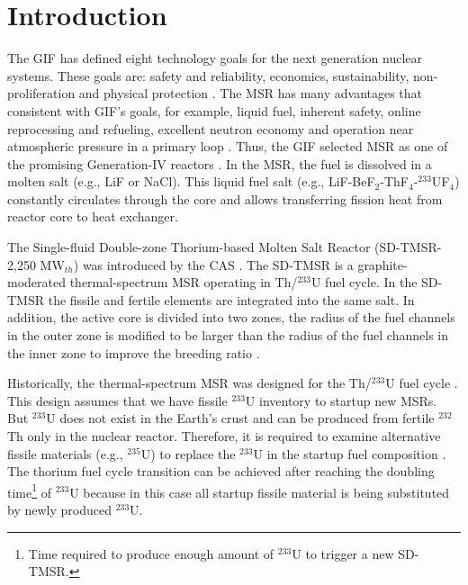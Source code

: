 \section{Introduction}
The \gls{GIF} has defined eight technology goals for the next generation
nuclear systems. These goals are: safety and reliability, economics,
sustainability, non-proliferation and physical protection
\cite{doe2002technology}. The \gls{MSR} has many advantages that consistent
with \gls{GIF}'s goals, for example, liquid fuel, inherent safety, online
reprocessing and refueling, excellent neutron economy and operation near
atmospheric
pressure in a primary loop \cite{siemer2015molten,rosenthal1970molten}.
Thus, the \gls{GIF} selected \gls{MSR} as one of the promising Generation-IV
reactors \cite{doe2002technology,pioro2016handbook}.
In the \gls{MSR}, the fuel is dissolved in a molten salt (e.g., LiF or NaCl).
This liquid fuel salt (e.g., LiF-BeF$_2$-ThF$_4$-$^{233}$UF$_4$) constantly
circulates through the core and allows transferring fission heat from reactor
core to heat exchanger.

The Single-fluid Double-zone Thorium-based Molten Salt Reactor (SD-TMSR-2,250
MW$_{th}$) was introduced by the \gls{CAS} \cite{li_optimization_2018}. The
SD-TMSR
is a graphite-moderated thermal-spectrum \gls{MSR} operating in Th/$^{233}$U
fuel cycle. In the SD-TMSR the fissile and fertile elements are integrated
into the same salt. In addition, the active core is divided into two zones,
the radius of the fuel channels in the outer zone is modified to be larger
than the radius of the fuel channels in the inner zone to improve the breeding
ratio \cite{nuttin2005potential,li_optimization_2018}.

Historically, the thermal-spectrum \gls{MSR} was designed for the Th/$^{233}$U
fuel cycle \cite{rykhlevskii2019modeling,nuttin2005potential,
merle2004scenarios,rosenthal1970molten}. This design assumes that we have
fissile $^{233}$U inventory to startup new \glspl{MSR}. But $^{233}$U does not
exist in the Earth's crust and can be produced from fertile $^{232}$Th only in
the nuclear reactor. Therefore, it is required to examine alternative fissile
materials (e.g., $^{235}$U) to replace the $^{233}$U in the startup fuel
composition \cite{betzler2016modeling,zou2018transition}. The thorium fuel
cycle transition can be achieved after reaching the doubling
time\footnote{Time required to produce enough amount of $^{233}$U to trigger a
new SD-TMSR.} of $^{233}$U because in this case all startup fissile material
is being substituted by newly produced $^{233}$U.

